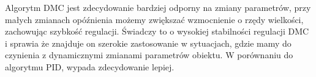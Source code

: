 \documentclass[a4paper, 11pt]{article}
\begin{document}
Algorytm DMC jest zdecydowanie bardziej odporny na zmiany parametrów, przy małych zmianach opóźnienia możemy zwiększać wzmocnienie o rzędy wielkości, zachowując szybkość regulacji. Świadczy to o wysokiej stabilności regulacji DMC i sprawia że znajduje on szerokie zastosowanie w sytuacjach, gdzie mamy do czynienia z dynamicznymi zmianami parametrów obiektu. W porównaniu do algorytmu PID, wypada zdecydowanie lepiej. 



 
 

 
 
\end{document}
